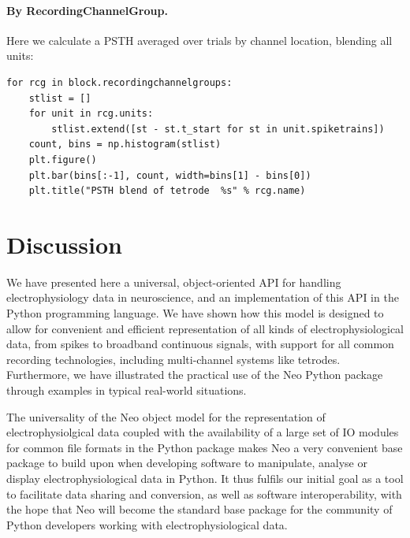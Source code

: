 \documentclass{frontiers}
\begin{document}
\paragraph{By RecordingChannelGroup.}
Here we calculate a PSTH averaged over trials by channel location, blending all units:
\begin{lstlisting}[style=display]
for rcg in block.recordingchannelgroups:
    stlist = []
    for unit in rcg.units:
        stlist.extend([st - st.t_start for st in unit.spiketrains])
    count, bins = np.histogram(stlist)
    plt.figure()
    plt.bar(bins[:-1], count, width=bins[1] - bins[0])
    plt.title("PSTH blend of tetrode  %s" % rcg.name)
\end{lstlisting}



\section{Discussion}


We have presented here a universal, object-oriented API for handling electrophysiology data in neuroscience, and an implementation of this API in the Python programming language. 
We have shown how this model is designed to allow for convenient and efficient representation of all kinds of electrophysiological data, from spikes to broadband continuous signals, with support for all common recording technologies, including multi-channel systems like tetrodes.
Furthermore, we have illustrated the practical use of the Neo Python package through examples in typical real-world situations.

The universality of the Neo object model for the representation of electrophysiolgical data coupled with the availability of a large set of IO modules for common file formats in the Python package makes Neo a very convenient base package to build upon when developing software to manipulate, analyse or display electrophysiological data in Python.
It thus fulfils our initial goal as a tool to facilitate data sharing and conversion, as well as software interoperability, with the hope that Neo will become the standard base package for the community of Python developers working with electrophysiological data.
\end{document}
